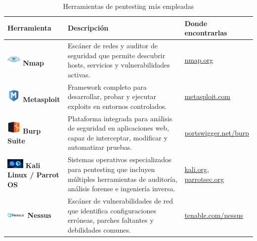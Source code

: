 \documentclass[a4paper, 10pt]{article}
\begin{document}
    \begin{table}[H]
    \caption{Herramientas de pentesting más empleadas}
    \centering
    \begin{tabular}{|m{5cm}|m{8cm}|m{3.5cm}|}
        \hline
        \textbf{Herramienta} & \textbf{Descripción} & \textbf{Donde encontrarlas} \\
        \hline
        \includegraphics[width=0.7cm]{images/nmap.jpeg} \textbf{Nmap} & Escáner de redes y auditor de seguridad que permite descubrir hosts, servicios y vulnerabilidades activas. & \href{https://nmap.org}{nmap.org} \\
        \hline
        \includegraphics[width=0.7cm]{images/metasploit.jpeg} \textbf{Metasploit} & Framework completo para desarrollar, probar y ejecutar exploits en entornos controlados. & \href{https://www.metasploit.com}{metasploit.com} \\
        \hline
        \includegraphics[width=0.7cm]{images/burp.jpeg} \textbf{Burp Suite} & Plataforma integrada para análisis de seguridad en aplicaciones web, capaz de interceptar, modificar y automatizar pruebas. & \href{https://portswigger.net/burp}{portswigger.net/burp} \\
        \hline
        \includegraphics[width=0.85cm]{images/kali.jpeg} \textbf{Kali Linux / Parrot OS} & Sistemas operativos especializados para pentesting que incluyen múltiples herramientas de auditoría, análisis forense e ingeniería inversa. & \href{https://www.kali.org}{kali.org}, \href{https://www.parrotsec.org}{parrotsec.org} \\
        \hline
        \includegraphics[width=0.95cm]{images/nessus.png} \textbf{Nessus} & Escáner de vulnerabilidades de red que identifica configuraciones erróneas, parches faltantes y debilidades comunes. & \href{https://www.tenable.com/products/nessus}{tenable.com/nessus} \\
        \hline

\end{tabular}
\end{table}
\end{document}
